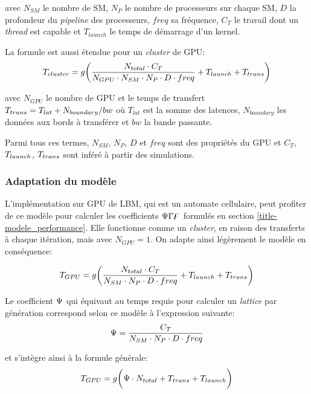 avec $N_{SM}$ le nombre de \ac{SM}, $N_P$ le nombre de processeurs sur chaque \ac{SM}, $D$ la profondeur du \textit{pipeline} des processeurs, $freq$ sa fréquence, $C_T$ le travail dont un \textit{thread} est capable et $T_{launch}$ le temps de démarrage d'un kernel.

La formule est aussi étendue pour un \textit{cluster} de \acs{GPU}:
\begin{equation}
T_{cluster} = g \bigg( \frac{N_{total}\cdot C_T}{N_{GPU} \cdot N_{SM}\cdot N_P \cdot D \cdot freq} + T_{launch}+ T_{trans}\bigg)
\end{equation}

avec $N_{GPU}$ le nombre de \acs{GPU} et le temps de transfert $T_{trans} = T_{lat}+ N_{boundary}/bw$ où $T_{lat}$ est la somme des latences, $N_{boundary}$ les données aux bords à transférer et $bw$ la bande passante. 

Parmi tous ces termes, $N_{SM}$, $N_P$, $D$ et $freq$ sont des propriétés du \acs{GPU} et $C_T$, $T_{launch}$, $T_{trans}$ sont inféré à partir des simulations.
\subsubsection{Adaptation du modèle}
L'implémentation sur \acs{GPU} de \ac{LBM}, qui est un automate cellulaire, peut profiter de ce modèle pour calculer les coefficients $\Psi\Gamma\digamma$ formulés en section \ref{title-modele_performance}.  Elle fonctionne comme un \textit{cluster}, en raison des transferts à chaque itération, mais avec $N_{GPU}=1$. On adapte ainsi légèrement le modèle en conséquence:

\begin{equation}
T_{GPU} = g \bigg( \frac{N_{total}\cdot C_T}{N_{SM}\cdot N_P \cdot D \cdot freq} + T_{launch} + T_{trans}\bigg)
\end{equation}

Le coefficient $\Psi$ qui équivaut au temps requis pour calculer un \textit{lattice} par génération correspond selon ce modèle à l'expression suivante:
\begin{equation}
\Psi= \frac{C_T}{N_{SM}\cdot N_P \cdot D \cdot freq}
\end{equation}

et s'intègre ainsi à la formule générale:
\begin{equation}
T_{GPU} = g \bigg( \Psi \cdot N_{total} + T_{trans} + T_{launch}  \bigg)
\end{equation}

